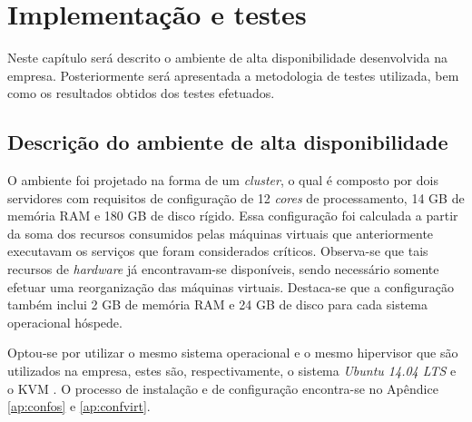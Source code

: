 \chapter{Implementação e testes}
\label{cap:implementacaoresultados}

Neste capítulo será descrito o ambiente de alta disponibilidade desenvolvida na empresa. Posteriormente será apresentada a metodologia de testes 
utilizada, bem como os resultados obtidos dos testes efetuados.

\section{Descrição do ambiente de alta disponibilidade}
\label{section:implementacao}


O ambiente foi projetado na forma de um \textit{cluster}, o qual é composto por dois servidores com requisitos de configuração 
de 12 \textit{cores} de processamento, 14 GB de memória \ac{RAM} e 180 GB de disco rígido.
Essa configuração foi calculada a partir da soma dos recursos consumidos pelas máquinas virtuais que anteriormente executavam os serviços que foram 
considerados críticos. Observa-se que tais recursos de \textit{hardware} já encontravam-se disponíveis, sendo necessário somente efetuar uma 
reorganização das máquinas virtuais. Destaca-se que a configuração também inclui 2 GB de memória \ac{RAM} e 24 GB de disco para cada sistema 
operacional hóspede.

Optou-se por utilizar o mesmo sistema operacional e o mesmo hipervisor que são utilizados na empresa, estes são, respectivamente, o sistema 
\textit{Ubuntu 14.04 \ac{LTS}} e o \ac{KVM} \cite{kvm}. O processo de instalação e de configuração encontra-se no 
Apêndice \ref{ap:confos} e \ref{ap:confvirt}.

